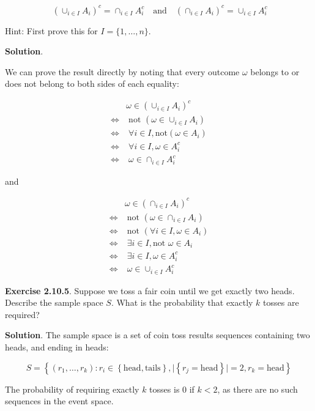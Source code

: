 \[ \
\left( \cup_{i \in I} A_i \right)^c = \cap_{i \in I} A_i^c 
\quad \text{and} \quad
\left( \cap_{i \in I} A_i \right)^c = \cup_{i \in I} A_i^c 
\]

Hint: First prove this for \(I = \{1, \dots, n\}\).

\textbf{Solution}.

We can prove the result directly by noting that every outcome \(\omega\)
belongs to or does not belong to both sides of each equality:

\begin{align}
& \omega \in \left( \cup_{i \in I} A_i \right)^c \\
\Longleftrightarrow& \; \text{not }\left( \omega \in \cup_{i \in I} A_i  \right) \\
\Longleftrightarrow& \; \forall i \in I, \text{not} \left( \omega \in A_i \right) \\
\Longleftrightarrow& \; \forall i \in I, \omega \in A_i^c \\
\Longleftrightarrow& \; \omega \in \cap_{i \in I} A_i^c
\end{align}

and

\begin{align}
& \omega \in \left( \cap_{i \in I} A_i \right)^c  \\
\Longleftrightarrow&\; \text{not }\left( \omega \in \cap_{i \in I} A_i  \right) \\
\Longleftrightarrow&\; \text{not } \left( \forall i \in I, \omega \in A_i \right) \\
\Longleftrightarrow&\; \exists i \in I, \text{not } \omega \in A_i \\
\Longleftrightarrow&\; \exists i \in I, \omega \in A_i^c \\
\Longleftrightarrow&\; \omega \in \cup_{i \in I} A_i^c 
\end{align}

\textbf{Exercise 2.10.5}. Suppose we toss a fair coin until we get
exactly two heads. Describe the sample space \(S\). What is the
probability that exactly \(k\) tosses are required?

\textbf{Solution}. The sample space is a set of coin toss results
sequences containing two heads, and ending in heads:

\[ S = \left\{ (r_1, \dots, r_k) : r_i \in \left\{ \text{head}, \text{tails} \right\} , 
\Big| \left\{ r_j = \text{head} \right\} \Big|= 2, r_k = \text{head} \right\} \]

The probability of requiring exactly \(k\) tosses is 0 if \(k < 2\), as
there are no such sequences in the event space.

